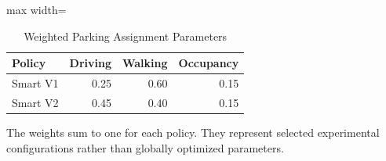 \begin{table}[t]
\centering
\caption{Weighted Parking Assignment Parameters}
\label{tab:policy_weights}
\small
\setlength{\tabcolsep}{4pt}
\begin{adjustbox}{max width=\columnwidth}

\begin{tabular}{lrrr}
\toprule
Policy & Driving & Walking & Occupancy\\
\midrule
Smart V1 & 0.25 & 0.60 & 0.15\\
Smart V2 & 0.45 & 0.40 & 0.15\\
\bottomrule
\end{tabular}
\end{adjustbox}
\par\smallskip
\begin{minipage}{\columnwidth}
\footnotesize
The weights sum to one for each policy. They represent selected experimental configurations rather than globally optimized parameters.
\end{minipage}
\end{table}

